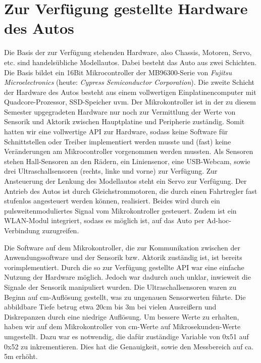 \section{Zur Verfügung gestellte Hardware des Autos}
\label{sec:grundlegendesHW}

Die Basis der zur Verfügung stehenden Hardware, also Chassis, Motoren, Servo, etc. sind handelsübliche Modellautos. Dabei besteht das Auto aus zwei Schichten. Die Basis bildet ein 16Bit Mikrocontroller der MB96300-Serie von \textit{Fujitsu Microelectronics} (heute: \textit{Cypress Semiconductor Corporation}). Die zweite Schicht der Hardware des Autos besteht aus einem vollwertigen Einplatinencomputer mit Quadcore-Prozessor, SSD-Speicher uvm. Der Mikrokontroller ist in der zu diesem Semester upgegradeten Hardware nur noch zur Vermittlung der Werte von Sensorik und Aktorik zwischen Hauptplatine und Peripherie zuständig. Somit hatten wir eine vollwertige API zur Hardware, sodass keine Software für Schnittstellen oder Treiber implementiert werden musste und (fast) keine Veränderungen am Mikrocontroller vorgenommen werden mussten. Als Sensoren stehen Hall-Sensoren an den Rädern, ein Liniensenor, eine USB-Webcam, sowie drei Ultraschallsensoren (rechts, linke und vorne) zur Verfügung. Zur Ansteuerung der Lenkung des Modellautos steht ein Servo zur Verfügung. Der Antrieb des Autos ist durch Gleichstrommotoren, die durch einen Fahrtregler fast stufenlos angesteuert werden können, realisiert. Beides wird durch ein pulsweitenmoduliertes Signal vom Mikrokontroller gesteuert. Zudem ist ein WLAN-Modul integriert, sodass es möglich ist, auf das Auto per Ad-hoc-Verbindung zuzugreifen. 

Die Software auf dem Mikrokontroller, die zur Kommunikation zwischen der Anwendungssoftware und der Sensorik bzw. Aktorik zuständig ist, ist bereits vorimplementiert. Durch die so zur Verfügung gestellte API war eine einfache Nutzung der Hardware möglich. Jedoch war dadurch auch unklar, inwieweit die Signale der Sensorik manipuliert wurden. Die Ultraschallsensoren waren zu Beginn auf cm-Auflösung gestellt, was zu ungenauen Sensorwerten führte. Die abbildbare Tiefe betrug etwa 20cm bis 3m bei vielen Ausreißern und Diskrepanzen durch eine niedrige Auflösung. Um bessere Werte zu erhalten, haben wir auf dem Mikrokontroller von cm-Werte auf Mikrosekunden-Werte umgestellt. Dazu war es notwendig, die dafür zuständige Variable von 0x51 auf 0x52 zu inkrementieren. Dies hat die Genauigkeit, sowie den Messbereich auf ca. 5m erhöht. 
